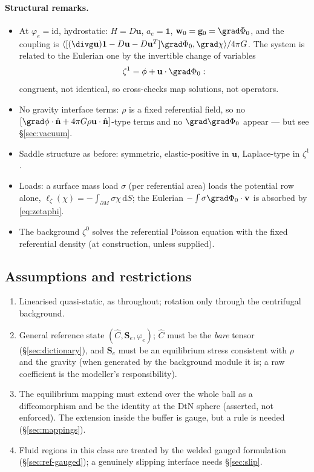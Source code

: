 \documentclass[11pt]{article}
\numberwithin{equation}{section}
\theoremstyle{remark}
\newcommand{\dS}{\,\mathrm{d}S}
\newcommand{\vu}{\mathbf{u}}
\newcommand{\vv}{\mathbf{v}}
\newcommand{\vw}{\mathbf{w}}
\newcommand{\vn}{\hat{\mathbf{n}}}
\newcommand{\vg}{\mathbf{g}}
\newcommand{\Ch}{\hat{C}}
\newcommand{\Se}{\mathbf{S}_e}
\begin{document}
\paragraph{Structural remarks.}
\begin{itemize}
\item At $\varphi_e = \mathrm{id}$, hydrostatic: $H = D\vu$, $a_e =
  \mathbf{1}$, $\vw_0 = \vg_0 = \grad\Phi_0$, and the coupling is
  $\langle[(\divg\vu)\mathbf{1} - D\vu - D\vu^T]\grad\Phi_0,\grad\chi
  \rangle/4\pi G$. The system is related to the Eulerian one by the
  invertible change of variables
  \begin{equation}
    \zeta^1 = \phi + \vu\cdot\grad\Phi_0 :
    \label{eq:zetaphi}
  \end{equation}
  congruent, not identical, so cross-checks map solutions, not operators.
\item No gravity interface terms: $\rho$ is a fixed referential field, so
  no $[\grad\phi\cdot\vn + 4\pi G\rho\vu\cdot\vn]$-type terms and no
  $\grad\grad\Phi_0$ appear --- but see \S\ref{sec:vacuum}.
\item Saddle structure as before: symmetric, elastic-positive in $\vu$,
  Laplace-type in $\zeta^1$.
\item Loads: a surface mass load $\sigma$ (per referential area) loads the
  potential row alone, $\ell_\zeta(\chi) = -\int_{\partial M}\sigma\chi\dS$;
  the Eulerian $-\int\sigma\grad\Phi_0\cdot\vv$ is absorbed by
  \eqref{eq:zetaphi}.
\item The background $\zeta^0$ solves the referential Poisson equation with
  the fixed referential density (at construction, unless supplied).
\end{itemize}

\subsection{Assumptions and restrictions}

\begin{enumerate}
\item[(R1)] Linearised quasi-static, as throughout; rotation only through
  the centrifugal background.
\item[(R2)] General reference state $(\Ch,\Se,\varphi_e)$; $\Ch$ must be
  the \emph{bare} tensor (\S\ref{sec:dictionary}), and $\Se$ must be an
  equilibrium stress consistent with $\rho$ and the gravity (when generated
  by the background module it is; a raw coefficient is the modeller's
  responsibility).
\item[(R3)] The equilibrium mapping must extend over the whole ball as a
  diffeomorphism and be the identity at the DtN sphere (asserted, not
  enforced). The extension inside the buffer is gauge, but a rule is
  needed (\S\ref{sec:mappings}).
\item[(R4)] Fluid regions in this class are treated by the welded gauged
  formulation (\S\ref{sec:ref-gauged}); a genuinely slipping interface
  needs \S\ref{sec:slip}.
\end{enumerate}
\end{document}
